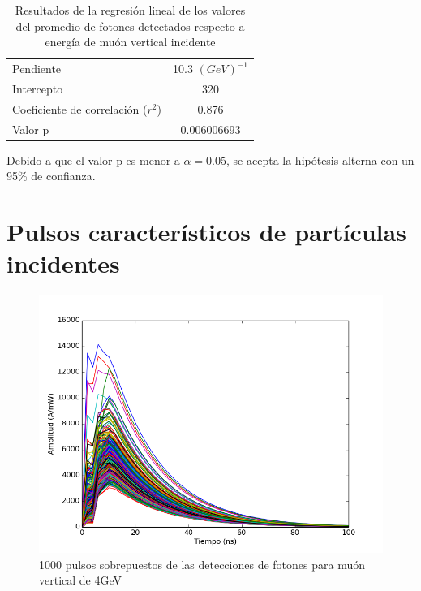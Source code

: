\documentclass{book}
\begin{document}
\begin{table}[h]
\centering
\caption{ Resultados de la regresi\'on lineal de los valores del promedio de fotones detectados respecto a energ\'ia de mu\'on vertical incidente}
\begin{tabular}{l | c}
\hline
Pendiente & 10.3 $(GeV)^{-1}$ \\
Intercepto & 320 \\
Coeficiente de correlaci\'on ($r^2$) & 0.876 \\
Valor p & 0.006006693 \\

\hline
\end{tabular}
\end{table}

Debido a que el valor p es menor a $\alpha=0.05$, se acepta la hip\'otesis alterna con un 95\% de confianza.

\section{Pulsos caracter\'isticos de part\'iculas incidentes}

\begin{figure}[h] %
\begin{center}
 \includegraphics[width=0.8\linewidth]{1000PulsosMu.png}
\caption{1000 pulsos sobrepuestos de las detecciones de fotones para mu\'on vertical de 4GeV}
\end{center}
\end{figure}
\end{document}
